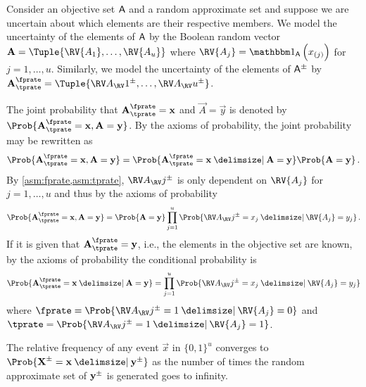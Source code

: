 \documentclass[ ../main.tex]{subfiles}
\begin{document}

Consider an objective set $\Set{A}$ and a random approximate set  and suppose we are uncertain about which elements are their respective members.
We model the uncertainty of the elements of $\Set{A}$ by the Boolean random vector $\vec{A} = \Tuple{\RV{A_1},\ldots,\RV{A_u}}$ where $\RV{A_j} = \SetIndicator{\Set{A}}\left(x_{(j)}\right)$ for $j=1,\ldots,u$.
Similarly, we model the uncertainty of the elements of $\ASet{A}$ by $\AVec{A}[\tprate][\fprate] = \Tuple{\AVecComp{A}[1],\ldots,\AVecComp{A}[u]}$.

The joint probability that $\AVec{A}[\tprate][\fprate] = \vec{x}$ and $\vec{A} = \vec{y}$ is denoted by $\Prob{\AVec{A}[\tprate][\fprate] = \vec{x},\vec{A} = \vec{y}}$.
By the axioms of probability, the joint probability may be rewritten as
\begin{equation}
    \Prob{\AVec{A}[\tprate][\fprate] = \vec{x},\vec{A} = \vec{y}} =
        \Prob{\AVec{A}[\tprate][\fprate] = \vec{x} \Given \vec{A} = \vec{y}}
        \Prob{\vec{A} = \vec{y}}\,.
\end{equation}
By \cref{asm:fprate,asm:tprate}, $\AVecComp{A}[j]$ is only dependent on 
$\RV{A_j}$ for $j=1,\ldots,u$ and thus by the axioms of probability
\begin{equation}
    \Prob{\AVec{A}[\tprate][\fprate] = \vec{x},\vec{A} = \vec{y}} = 
    \Prob{\vec{A} = \vec{y}} 
        \prod_{j=1}^{u} \Prob{\AVecComp{A}[j] = x_j \Given \RV{A_j} = y_j}\,.
\end{equation}
If it is given that $\AVec{A}[\tprate][\fprate] = \vec{y}$, i.e., the elements in the 
objective set are known, by the axioms of probability the conditional 
probability is
\begin{equation}
    \Prob{\AVec{A}[\tprate][\fprate] = \vec{x} \Given \vec{A} = \vec{y}} = \prod_{j=1}^{u} 
    \Prob{\AVecComp{A}[j] = x_j \Given \RV{A_j} = y_j}
\end{equation}
where $\fprate = \Prob{\AVecComp{A}[j]=1 \Given \RV{A_j}=0}$ and $\tprate = \Prob{\AVecComp{A}[j]=1 \Given \RV{A_j}=1}$.




The relative frequency of any event $\vec{x}$ in $\{0,1\}^u$ converges to $\Prob{\AVec{X} = \vec{x} \Given \AVec{y}}$ as the number of times the random approximate set of $\AVec{y}$ is generated goes to infinity.
\end{document}
